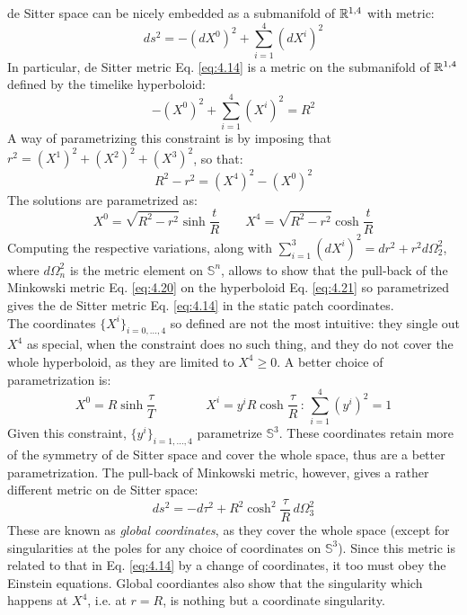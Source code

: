 de Sitter space can be nicely embedded as a submanifold of $ \mathbb{R}^{1,4} $ with metric:
\begin{equation}
  ds^2 = - (dX^0)^2 + \sum_{i = 1}^{4} (dX^i)^2
  \label{eq:4.20}
\end{equation}
In particular, de Sitter metric Eq. \ref{eq:4.14} is a metric on the submanifold of $ \mathbb{R}^{1,4} $ defined by the timelike hyperboloid:
\begin{equation}
  -(X^0)^2 + \sum_{i = 1}^{4} (X^i)^2 = R^2
  \label{eq:4.21}
\end{equation}
A way of parametrizing this constraint is by imposing that $ r^2 = (X^1)^2 + (X^2)^2 + (X^3)^2 $, so that:
\begin{equation*}
  R^2 - r^2 = (X^4)^2 - (X^0)^2
\end{equation*}
The solutions are parametrized as:
\begin{equation*}
  X^0 = \sqrt{R^2 - r^2} \sinh \frac{t}{R}
  \qquad
  X^4 = \sqrt{R^2 - r^2} \cosh \frac{t}{R}
\end{equation*}
Computing the respective variations, along with $ \sum_{i = 1}^{3} (dX^i)^2 = dr^2 + r^2 d\Omega_2^2 $, where $ d\Omega_n^2 $ is the metric element on $ \mathbb{S}^n $, allows to show that the pull-back of the Minkowski metric Eq. \ref{eq:4.20} on the hyperboloid Eq. \ref{eq:4.21} so parametrized gives the de Sitter metric Eq. \ref{eq:4.14} in the static patch coordinates.\\
The coordinates $ \{X^i\}_{i = 0,\dots,4} $ so defined are not the most intuitive: they single out $ X^4 $ as special, when the constraint does no such thing, and they do not cover the whole hyperboloid, as they are limited to $ X^4 \ge 0 $. A better choice of parametrization is:
\begin{equation*}
  X^0 = R \sinh \frac{\tau}{T}
  \qquad \qquad
  X^i = y^i R \cosh \frac{\tau}{R}
  \,:\,
  \sum_{i = 1}^{4} (y^i)^2 = 1
\end{equation*}
Given this constraint, $ \{y^i\}_{i = 1, \dots, 4} $ parametrize $ \mathbb{S}^3 $. These coordinates retain more of the symmetry of de Sitter space and cover the whole space, thus are a better parametrization. The pull-back of Minkowski metric, however, gives a rather different metric on de Sitter space:
\begin{equation}
  ds^2 = - d\tau^2 + R^2 \cosh^2 \frac{\tau}{R}\, d\Omega_3^2
  \label{eq:4.22}
\end{equation}
These are known as \textit{global coordinates}, as they cover the whole space (except for singularities at the poles for any choice of coordinates on $ \mathbb{S}^3 $). Since this metric is related to that in Eq. \ref{eq:4.14} by a change of coordinates, it too must obey the Einstein equations. Global coordiantes also show that the singularity which happens at $ X^4 $, i.e. at $ r = R $, is nothing but a coordinate singularity.

